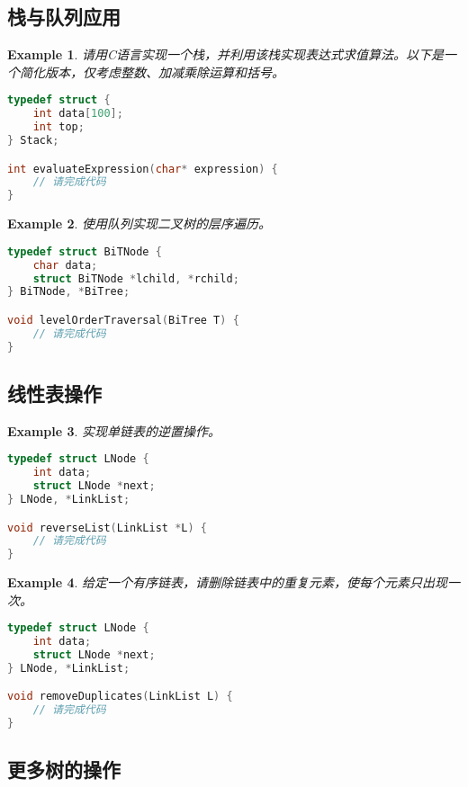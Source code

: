 \documentclass{../../note}
\newtheorem{example}{Example}
\begin{document}
\subsection{栈与队列应用}

\begin{example}
请用C语言实现一个栈，并利用该栈实现表达式求值算法。以下是一个简化版本，仅考虑整数、加减乘除运算和括号。
\begin{lstlisting}[language=C]
typedef struct {
    int data[100];
    int top;
} Stack;

int evaluateExpression(char* expression) {
    // 请完成代码
}
\end{lstlisting}
\end{example}

\begin{example}
使用队列实现二叉树的层序遍历。
\begin{lstlisting}[language=C]
typedef struct BiTNode {
    char data;
    struct BiTNode *lchild, *rchild;
} BiTNode, *BiTree;

void levelOrderTraversal(BiTree T) {
    // 请完成代码
}
\end{lstlisting}
\end{example}

\subsection{线性表操作}

\begin{example}
实现单链表的逆置操作。
\begin{lstlisting}[language=C]
typedef struct LNode {
    int data;
    struct LNode *next;
} LNode, *LinkList;

void reverseList(LinkList *L) {
    // 请完成代码
}
\end{lstlisting}
\end{example}

\begin{example}
给定一个有序链表，请删除链表中的重复元素，使每个元素只出现一次。
\begin{lstlisting}[language=C]
typedef struct LNode {
    int data;
    struct LNode *next;
} LNode, *LinkList;

void removeDuplicates(LinkList L) {
    // 请完成代码
}
\end{lstlisting}
\end{example}

\subsection{更多树的操作}
\end{document}
